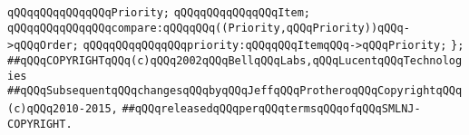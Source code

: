 \newline
\verb|qQQqqQQqqQQqqQQqPriority;|\newline
\verb|qQQqqQQqqQQqqQQqItem;|\newline
\newline
\verb|qQQqqQQqqQQqqQQqcompare:qQQqqQQq((Priority,qQQqPriority))qQQq->qQQqOrder;|\newline
\verb|qQQqqQQqqQQqqQQqpriority:qQQqqQQqItemqQQq->qQQqPriority;|\newline
\verb|};|\newline
\newline
\newline
\newline
\verb|##qQQqCOPYRIGHTqQQq(c)qQQq2002qQQqBellqQQqLabs,qQQqLucentqQQqTechnologies|\newline
\verb|##qQQqSubsequentqQQqchangesqQQqbyqQQqJeffqQQqProtheroqQQqCopyrightqQQq(c)qQQq2010-2015,|\newline
\verb|##qQQqreleasedqQQqperqQQqtermsqQQqofqQQqSMLNJ-COPYRIGHT.|\newline

